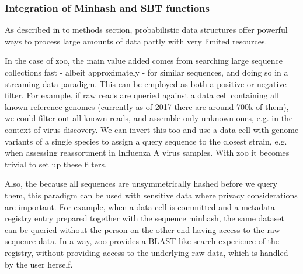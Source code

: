 \subsubsection{Integration of Minhash and SBT functions}

As described in to methods section, probabilistic data structures offer powerful ways to process large amounts of data partly with very limited resources.

In the case of zoo, the main value added comes from searching large sequence collections fast - albeit approximately - for similar sequences, and doing so in a streaming data paradigm. This can be employed as both a positive or negative filter. For example, if raw reads are queried against a data cell containing all known reference genomes (currently as of 2017 there are around 700k of them), we could filter out all known reads, and assemble only unknown ones, e.g. in the context of virus discovery. We can invert this too and use a data cell with genome variants of a single species to assign a query sequence to the closest strain, e.g. when assessing reassortment in Influenza A virus samples. With zoo it becomes trivial to set up these filters.

Also, the because all sequences are unsymmetrically hashed before we query them, this paradigm can be used with sensitive data where privacy considerations are important. For example, when a data cell is committed and a metadata registry entry prepared together with the sequence minhash, the same dataset can be queried without the person on  the other end having access to the raw sequence data. In a way, zoo provides a BLAST-like search experience of the registry, without providing access to the underlying raw data, which is handled by the user herself.
